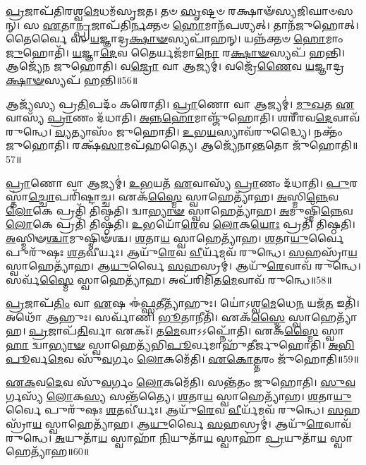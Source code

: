 \-\ul{𑌪𑍍𑌰}\-𑌜𑌾𑌪᳴𑌤𑌿𑌰𑌶𑍍𑌵\-\ul{𑌮𑍇}\-𑌧𑌮᳴\-𑌸𑍃𑌜𑌤।
𑌤𑍞 \ul{𑌸𑍃}\-𑌷𑍍𑌟𑍞 𑌰𑌕𑍍𑌷𑌾𑍟᳴𑌸𑍍𑌯𑌜𑌿𑌘𑌾𑍞𑌸𑌨𑍍।
𑌸 \ul{𑌏}\-𑌤𑌾\-\ul{𑌨𑍍𑌪𑍍𑌰}\-𑌜𑌾𑌪᳴𑌤𑌿\-\ul{𑌰𑍍𑌨}\-𑌕𑍍𑌤𑍞 \ul{𑌹𑍋}\-𑌮𑌾𑌨᳴𑌪𑌶𑍍𑌯𑌤𑍍।
𑌤𑌾𑌨᳴𑌜𑍁𑌹𑍋𑌤𑍍।
𑌤𑍈𑌰𑍍𑌵𑍈 𑌸 \ul{𑌯}\-𑌜𑍍𑌞𑌾𑌦𑍍𑌰\-\ul{𑌕𑍍𑌷𑌾}\-\-\ul{𑍟}\-𑌸𑍍𑌯𑌪𑌾᳴𑌹𑌨𑍍।
𑌯𑌨𑍍𑌨᳴𑌕𑍍𑌤𑍞 \ul{𑌹𑍋}\-𑌮𑌾𑌂 \ul{𑌜𑍁}\-𑌹𑍋𑌤𑌿᳴।
\-\ul{𑌯}\-𑌜𑍍𑌞𑌾\-\ul{𑌦𑍇}\-𑌵 𑌤𑍈𑌰𑍍𑌯𑌜᳴𑌮𑌾\-\ul{𑌨𑍋} 𑌰\-\ul{𑌕𑍍𑌷𑌾}\-\-\ul{𑍟}\-𑌸𑍍𑌯𑌪᳴ 𑌹𑌨𑍍𑌤𑌿।
𑌆𑌜𑍍𑌯𑍇᳴𑌨 𑌜𑍁𑌹𑍋𑌤𑌿।
𑌵\-\ul{𑌜𑍍𑌰𑍋} 𑌵𑌾 𑌆𑌜𑍍𑌯𑌮𑍍॑।
𑌵𑌜𑍍𑌰𑍇᳴\-\ul{𑌣𑍈}\-𑌵 \ul{𑌯}\-𑌜𑍍𑌞𑌾𑌦𑍍𑌰\-\ul{𑌕𑍍𑌷𑌾}\-\-\ul{𑍟}\-𑌸𑍍𑌯𑌪᳴ 𑌹𑌨𑍍𑌤𑌿॥56॥

𑌆𑌜𑍍𑌯᳴𑌸𑍍𑌯 𑌪𑍍𑌰\-\ul{𑌤𑌿}\-𑌪𑌦𑌂᳴ 𑌕𑌰𑍋𑌤𑌿।
\-\ul{𑌪𑍍𑌰𑌾}\-𑌣𑍋 𑌵𑌾 𑌆𑌜𑍍𑌯𑌮𑍍॑।
\-\ul{𑌮𑍁}\-\-\ul{𑌖}\-𑌤 \ul{𑌏}\-𑌵𑌾𑌸𑍍𑌯᳴ \ul{𑌪𑍍𑌰𑌾}\-𑌣𑌂 𑌦᳴𑌧𑌾𑌤𑌿।
\-\ul{𑌅}\-\-\ul{𑌨𑍍𑌨}\-\-\ul{𑌹𑍋}\-𑌮𑌾𑌞𑍍𑌜𑍁᳴𑌹𑍋𑌤𑌿।
𑌶𑌰𑍀᳴𑌰𑌵\-\ul{𑌦𑍇}\-𑌵𑌾𑌵᳴ 𑌰𑍁𑌨𑍍𑌧𑍇।
\-\ul{𑌵𑍍𑌯}\-𑌤𑍍𑌯𑌾𑌸𑌂᳴ 𑌜𑍁𑌹𑍋𑌤𑌿।
\-\ul{𑌉}\-𑌭\-\ul{𑌯}\-𑌸𑍍𑌯𑌾𑌵᳴𑌰𑍁𑌦𑍍𑌧𑍍𑌯𑍈।
𑌨𑌕𑍍𑌤𑌂᳴ 𑌜𑍁𑌹𑍋𑌤𑌿।
𑌰𑌕𑍍𑌷᳴\-\ul{𑌸𑌾}\-𑌮𑌪᳴𑌹𑌤𑍍𑌯𑍈।
𑌆𑌜𑍍𑌯𑍇᳴𑌨𑌾\-\ul{𑌨𑍍𑌤}\-𑌤𑍋 𑌜𑍁᳴𑌹𑍋𑌤𑌿॥57॥

\-\ul{𑌪𑍍𑌰𑌾}\-𑌣𑍋 𑌵𑌾 𑌆𑌜𑍍𑌯𑌮𑍍॑।
\-\ul{𑌉}\-\-\ul{𑌭}\-𑌯𑌤᳴ \ul{𑌏}\-𑌵𑌾𑌸𑍍𑌯᳴ \ul{𑌪𑍍𑌰𑌾}\-𑌣𑌂 𑌦᳴𑌧𑌾𑌤𑌿।
\-\ul{𑌪𑍁}\-𑌰𑌸𑍍𑌤𑌾॑\-\ul{𑌚𑍍𑌚𑍋}\-𑌪𑌰𑌿᳴𑌷𑍍𑌟𑌾𑌚𑍍𑌚।
𑌏𑌕᳴\-\ul{𑌸𑍍𑌮𑍈} 𑌸𑍍𑌵𑌾𑌹𑍇𑌤𑍍𑌯𑌾᳴𑌹।
\-\ul{𑌅}\-𑌸𑍍𑌮𑌿\-\ul{𑌨𑍍𑌨𑍇}\-𑌵 \ul{𑌲𑍋}\-𑌕𑍇 𑌪𑍍𑌰𑌤𑌿᳴ 𑌤𑌿𑌷𑍍𑌠𑌤𑌿।
𑌦𑍍𑌵𑌾\-\ul{𑌭𑍍𑌯𑌾}\-\-\ul{𑍟} 𑌸𑍍𑌵𑌾𑌹𑍇𑌤𑍍𑌯𑌾᳴𑌹।
\-\ul{𑌅}\-𑌮𑍁𑌷𑍍𑌮𑌿᳴\-\ul{𑌨𑍍𑌨𑍇}\-𑌵 \ul{𑌲𑍋}\-𑌕𑍇 𑌪𑍍𑌰𑌤𑌿᳴ 𑌤𑌿𑌷𑍍𑌠𑌤𑌿।
\-\ul{𑌉}\-𑌭𑌯𑍋᳴\-\ul{𑌰𑍇}\-𑌵 \ul{𑌲𑍋}\-𑌕\-\ul{𑌯𑍋𑌃} 𑌪𑍍𑌰𑌤𑌿᳴ 𑌤𑌿𑌷𑍍𑌠𑌤𑌿।
\-\ul{𑌅}\-𑌸𑍍𑌮𑌿𑍟\-\ul{𑌶𑍍𑌚𑌾}\-𑌮𑍁𑌷𑍍𑌮𑌿𑍟᳴𑌶𑍍𑌚।
\-\ul{𑌶}\-𑌤𑌾\-\ul{𑌯} 𑌸𑍍𑌵𑌾𑌹𑍇𑌤𑍍𑌯𑌾᳴𑌹।
\-\ul{𑌶}\-𑌤𑌾\-\ul{𑌯𑍁}\-𑌰𑍍𑌵𑍈 𑌪𑍁𑌰𑍁᳴𑌷𑌃 \ul{𑌶}\-𑌤𑌵𑍀॑𑌰𑍍𑌯𑌃।
𑌆𑌯𑍁᳴\-\ul{𑌰𑍇}\-𑌵 \ul{𑌵𑍀}\-𑌰𑍍𑌯᳴𑌮𑌵᳴ 𑌰𑍁𑌨𑍍𑌧𑍇।
\-\ul{𑌸}\-𑌹𑌸𑍍𑌰𑌾᳴\-\ul{𑌯} 𑌸𑍍𑌵𑌾𑌹𑍇𑌤𑍍𑌯𑌾᳴𑌹।
𑌆\-\ul{𑌯𑍁}\-𑌰𑍍𑌵𑍈 \ul{𑌸}\-𑌹𑌸𑍍𑌰𑌮𑍍॑।
𑌆𑌯𑍁᳴\-\ul{𑌰𑍇}\-𑌵𑌾𑌵᳴ 𑌰𑍁𑌨𑍍𑌧𑍇।
𑌸𑌰𑍍𑌵᳴\-\ul{𑌸𑍍𑌮𑍈} 𑌸𑍍𑌵𑌾𑌹𑍇𑌤𑍍𑌯𑌾᳴𑌹।
𑌅𑌪᳴𑌰𑌿𑌮𑌿𑌤\-\ul{𑌮𑍇}\-𑌵𑌾𑌵᳴ 𑌰𑍁𑌨𑍍𑌧𑍇॥58॥\anuvakamend[\-\ul{𑌏}\-𑌵 \ul{𑌯}\-𑌜𑍍𑌞𑌾𑌦𑍍𑌰\-\ul{𑌕𑍍𑌷𑌾}\-\-\ul{𑍟}\-𑌸𑍍𑌯𑌪᳴𑌹𑌨𑍍𑌤𑍍𑌯\-\ul{𑌨𑍍𑌤}\-𑌤𑍋 𑌜𑍁᳴𑌹𑍋𑌤𑌿 \ul{𑌶}\-𑌤𑌾\-\ul{𑌯} 𑌸𑍍𑌵𑌾𑌹𑍇𑌤𑍍𑌯𑌾᳴𑌹 \ul{𑌸}\-𑌪𑍍𑌤 𑌚᳴]

\-\ul{𑌪𑍍𑌰}\-𑌜𑌾𑌪᳴\-\ul{𑌤𑌿𑌂} 𑌵𑌾 \ul{𑌏}\-𑌷 𑌈॑\-\ul{𑌫𑍍𑌸}\-𑌤𑍀𑌤𑍍𑌯𑌾᳴𑌹𑍁𑌃।
𑌯𑍋॑𑌽𑌶𑍍𑌵\-\ul{𑌮𑍇}\-𑌧𑍇\-\ul{𑌨} 𑌯𑌜᳴\-\ul{𑌤} 𑌇𑌤𑌿᳴।
𑌅𑌥𑍋᳴ 𑌆𑌹𑍁𑌃।
𑌸𑌰𑍍𑌵𑌾᳴𑌣𑌿 \ul{𑌭𑍂}\-𑌤𑌾𑌨𑍀𑌤𑌿᳴।
𑌏𑌕᳴\-\ul{𑌸𑍍𑌮𑍈} 𑌸𑍍𑌵𑌾𑌹𑍇𑌤𑍍𑌯𑌾᳴𑌹।
\-\ul{𑌪𑍍𑌰}\-𑌜𑌾𑌪᳴\-\ul{𑌤𑌿}\-𑌰𑍍𑌵𑌾 𑌏𑌕𑌃᳴।
𑌤\-\ul{𑌮𑍇}\-𑌵𑌾𑌽𑌽𑌪𑍍𑌨𑍋᳴𑌤𑌿।
𑌏𑌕᳴\-\ul{𑌸𑍍𑌮𑍈} 𑌸𑍍𑌵𑌾\-\ul{𑌹𑌾} 𑌦𑍍𑌵𑌾\-\ul{𑌭𑍍𑌯𑌾}\-\-\ul{𑍟} 𑌸𑍍𑌵𑌾𑌹𑍇𑌤𑍍𑌯᳴𑌭𑌿\-\ul{𑌪𑍂}\-𑌰𑍍𑌵𑌮𑌾𑌹𑍁᳴𑌤𑍀𑌰𑍍𑌜𑍁𑌹𑍋𑌤𑌿।
\-\ul{𑌅}\-\-\ul{𑌭𑌿}\-\-\ul{𑌪𑍂}\-𑌰𑍍𑌵\-\ul{𑌮𑍇}\-𑌵 𑌸𑍁᳴\-\ul{𑌵}\-𑌰𑍍𑌗𑌂 \ul{𑌲𑍋}\-𑌕𑌮𑍇᳴𑌤𑌿।
\-\ul{𑌏}\-\-\ul{𑌕𑍋}\-\-\ul{𑌤𑍍𑌤}\-𑌰𑌂 𑌜𑍁᳴𑌹𑍋𑌤𑌿॥59॥

\-\ul{𑌏}\-\-\ul{𑌕}\-𑌵\-\ul{𑌦𑍇}\-𑌵 𑌸𑍁᳴\-\ul{𑌵}\-𑌰𑍍𑌗𑌂 \ul{𑌲𑍋}\-𑌕𑌮𑍇᳴𑌤𑌿।
𑌸𑌨𑍍𑌤᳴𑌤𑌂 𑌜𑍁𑌹𑍋𑌤𑌿।
\-\ul{𑌸𑍁}\-\-\ul{𑌵}\-𑌰𑍍𑌗𑌸𑍍𑌯᳴ \ul{𑌲𑍋}\-𑌕\-\ul{𑌸𑍍𑌯} 𑌸𑌨𑍍𑌤᳴𑌤𑍍𑌯𑍈।
\-\ul{𑌶}\-𑌤𑌾\-\ul{𑌯} 𑌸𑍍𑌵𑌾𑌹𑍇𑌤𑍍𑌯𑌾᳴𑌹।
\-\ul{𑌶}\-𑌤𑌾\-\ul{𑌯𑍁}\-𑌰𑍍𑌵𑍈 𑌪𑍁𑌰𑍁᳴𑌷𑌃 \ul{𑌶}\-𑌤𑌵𑍀॑𑌰𑍍𑌯𑌃।
𑌆𑌯𑍁᳴\-\ul{𑌰𑍇}\-𑌵 \ul{𑌵𑍀}\-𑌰𑍍𑌯᳴𑌮𑌵᳴ 𑌰𑍁𑌨𑍍𑌧𑍇।
\-\ul{𑌸}\-𑌹𑌸𑍍𑌰𑌾᳴\-\ul{𑌯} 𑌸𑍍𑌵𑌾𑌹𑍇𑌤𑍍𑌯𑌾᳴𑌹।
𑌆\-\ul{𑌯𑍁}\-𑌰𑍍𑌵𑍈 \ul{𑌸}\-𑌹𑌸𑍍𑌰𑌮𑍍॑।
𑌆𑌯𑍁᳴\-\ul{𑌰𑍇}\-𑌵𑌾𑌵᳴ 𑌰𑍁𑌨𑍍𑌧𑍇।
\-\ul{𑌅}\-𑌯𑍁𑌤𑌾᳴\-\ul{𑌯} 𑌸𑍍𑌵𑌾𑌹𑌾᳴ \ul{𑌨𑌿}\-𑌯𑍁𑌤𑌾᳴\-\ul{𑌯} 𑌸𑍍𑌵𑌾𑌹𑌾॑ \ul{𑌪𑍍𑌰}\-𑌯𑍁𑌤𑌾᳴\-\ul{𑌯} 𑌸𑍍𑌵𑌾𑌹𑍇𑌤𑍍𑌯𑌾᳴𑌹॥60॥

